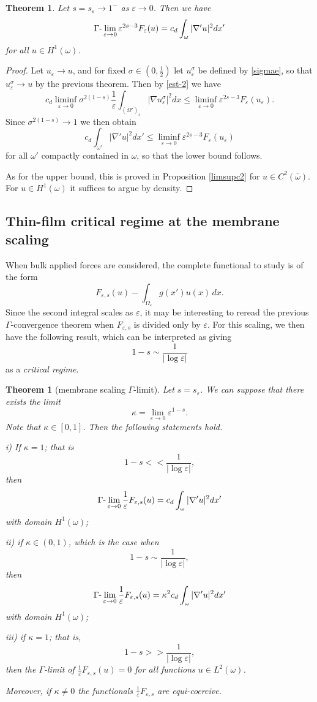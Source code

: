 \documentclass{article}
\newtheorem{theorem}[lemma]{Theorem}
\newcommand{\e}{\varepsilon}
\begin{document}
\begin{theorem}\label{Gammath} Let $s=s_\e\to 1^-$ as $\e\to 0$. 
Then we have
$$
\Gamma\hbox{-}\lim_{\e\to 0} \e^{2s-3} F_\e(u)= c_d\int_\omega |\nabla'u|^2dx'
$$
for all $u\in H^1(\omega)$.
\end{theorem}

\begin{proof} Let $u_\e\to u$, and for fixed $\sigma\in(0,\frac12)$ let $u^\sigma_\e$ be defined by \eqref{sigmae}, so that $u^\sigma_\e\to u$ by the previous theorem. Then by \eqref{est-2} we have
\begin{equation}\label{est-22}
 c_d\liminf_{\e\to 0}\sigma^{2(1-s)}\frac1\e \int_{(\Omega')_\e} |\nabla u^\sigma_\e|^2dx\le \liminf_{\e\to 0}\e^{2s-3} F_\e(u_\e).
\end{equation}
Since $\sigma^{2(1-s)}\to 1$ we then obtain
$$c_d\int_{\omega'}|\nabla 'u|^2dx'\le \liminf_{\e\to 0}\e^{2s-3} F_\e(u_\e)
$$
for all $\omega'$ compactly contained in $\omega$, so that the lower bound follows. 

As for the upper bound, this is proved in Proposition \ref{limsupc2} for $u\in C^2(\overline\omega)$.
For $u\in H^1(\omega)$ it suffices to argue by density. 
\end{proof}

\subsection{Thin-film critical regime at the membrane scaling}
When bulk applied forces are considered, the complete functional to study is of the form
$$
F_{\e,s}(u)-\int_{\Omega_\e} g(x')u(x)\,dx.
$$
Since the second integral scales as $\e$, it may be interesting to reread the previous $\Gamma$-convergence theorem when $F_{\e,s}$ is divided only by $\e$. For this scaling, we then have the following result, which can be interpreted as 
giving 
$$
1-s\sim\frac1{|\log\e|}
$$
as a {\em critical regime}.

\begin{theorem}[membrane scaling $\Gamma$-limit]
Let $s=s_\e$. We can suppose that there exists the limit 
$$
\kappa=\lim_{\e\to 0}  \e^{1-s}.
$$
Note that $\kappa\in[0,1]$.
Then the following statements hold.

{\rm i)} If  $\kappa=1$; that is 
$$
1-s<\!<\frac1{|\log\e|},
$$
then 
$$
\Gamma\hbox{-}\lim_{\e\to0} \frac1\e F_{\e,s}(u)=c_d\int_\omega |\nabla'u|^2dx'
$$
with domain $H^1(\omega)$;

{\rm ii)} if $\kappa\in (0,1)$, which is the case when
$$
1-s\sim\frac1{|\log\e|},
$$
 then 
$$
\Gamma\hbox{-}\lim_{\e\to0} \frac1\e F_{\e,s}(u)=\kappa^2 c_d\int_\omega |\nabla'u|^2dx'
$$
with domain $H^1(\omega)$;

{\rm iii)}  if  $\kappa=1$; that is,
$$
1-s>\!>\frac1{|\log\e|},
$$
then the $\Gamma$-limit of $\frac1\e F_{\e,s}(u)=0$ for all functions $u\in L^2(\omega)$.
 
 Moreover,  if $\kappa\ne0$ the functionals $ \frac1\e F_{\e,s}$ are equi-coercive.
\end{theorem}
\end{document}
